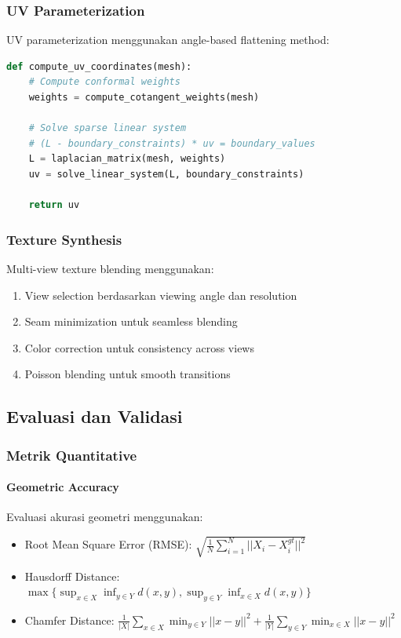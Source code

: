 \documentclass[12pt,a4paper]{article}
\begin{document}
\subsubsection{UV Parameterization}

UV parameterization menggunakan angle-based flattening method:

\begin{lstlisting}[language=Python, caption=UV Parameterization]
def compute_uv_coordinates(mesh):
    # Compute conformal weights
    weights = compute_cotangent_weights(mesh)
    
    # Solve sparse linear system
    # (L - boundary_constraints) * uv = boundary_values
    L = laplacian_matrix(mesh, weights)
    uv = solve_linear_system(L, boundary_constraints)
    
    return uv
\end{lstlisting}

\subsubsection{Texture Synthesis}

Multi-view texture blending menggunakan:
\begin{enumerate}
    \item View selection berdasarkan viewing angle dan resolution
    \item Seam minimization untuk seamless blending
    \item Color correction untuk consistency across views
    \item Poisson blending untuk smooth transitions
\end{enumerate}

\subsection{Evaluasi dan Validasi}

\subsubsection{Metrik Quantitative}

\paragraph{Geometric Accuracy}
Evaluasi akurasi geometri menggunakan:
\begin{itemize}
    \item Root Mean Square Error (RMSE): $\sqrt{\frac{1}{N}\sum_{i=1}^{N}||X_i - X_i^{gt}||^2}$
    \item Hausdorff Distance: $\max\{\sup_{x \in X} \inf_{y \in Y} d(x,y), \sup_{y \in Y} \inf_{x \in X} d(x,y)\}$
    \item Chamfer Distance: $\frac{1}{|X|}\sum_{x \in X} \min_{y \in Y} ||x-y||^2 + \frac{1}{|Y|}\sum_{y \in Y} \min_{x \in X} ||x-y||^2$
\end{itemize}
\end{document}
